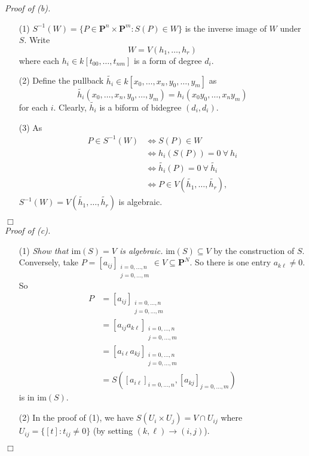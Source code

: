 \documentclass{article}
\begin{document}
\emph{Proof of (b).}
\begin{enumerate}
\item[(1)]
  $S^{-1}(W) = \{ P \in \mathbf{P}^{n} \times \mathbf{P}^{m} : S(P) \in W \}$
  is the inverse image of $W$ under $S$.
  Write
  \[
    W = V(h_1, \ldots, h_r)
  \]
  where each $h_i \in k[t_{00}, \ldots, t_{nm}]$ is a form of degree $d_i$.

\item[(2)]
  Define the pullback $\widetilde{h_i} \in k[x_0, \ldots, x_n, y_0, \ldots, y_m]$ as
  \[
    \widetilde{h_i}(x_0, \ldots, x_n, y_0, \ldots, y_m)
    = h_i(x_0 y_0, \ldots, x_n y_m)
  \]
  for each $i$.
  Clearly, $\widetilde{h_i}$ is a biform of bidegree $(d_i,d_i)$.

\item[(3)]
  As
  \begin{align*}
  P \in S^{-1}(W)
  &\Longleftrightarrow
    S(P) \in W \\
  &\Longleftrightarrow
    h_i(S(P)) = 0 \: \forall \: h_i \\
  &\Longleftrightarrow
    \widetilde{h_i}(P) = 0 \: \forall \: \widetilde{h_i} \\
  &\Longleftrightarrow
    P \in V(\widetilde{h_1}, \ldots, \widetilde{h_r}),
  \end{align*}
  $S^{-1}(W) = V(\widetilde{h_1}, \ldots, \widetilde{h_r})$ is algebraic.
\end{enumerate}
$\Box$ \\



\emph{Proof of (c).}
\begin{enumerate}
\item[(1)]
  \emph{Show that $\mathrm{im}(S) = V$ is algebraic.}
  $\mathrm{im}(S) \subseteq V$ by the construction of $S$.
  Conversely, take
  $P = [a_{ij}]_{\substack{i = 0,\ldots,n \\ j = 0,\ldots,m}} \in V \subseteq \mathbf{P}^{N}$.
  So there is one entry $a_{k\ell} \neq 0$.
  So
  \begin{align*}
    P
    &= [a_{ij}]_{\substack{i = 0,\ldots,n \\ j = 0,\ldots,m}} \\
    &= [a_{ij}a_{k\ell}]_{\substack{i = 0,\ldots,n \\ j = 0,\ldots,m}} \\
    &= [a_{i\ell}a_{kj}]_{\substack{i = 0,\ldots,n \\ j = 0,\ldots,m}} \\
    &= S([a_{i\ell}]_{i = 0,\ldots,n}, [a_{kj}]_{j = 0,\ldots,m})
  \end{align*}
  is in $\mathrm{im}(S)$.

\item[(2)]
  In the proof of (1),
  we have $S(U_i \times U_j) = V \cap U_{ij}$ where $U_{ij} = \{ [t] : t_{ij} \neq 0 \}$
  (by setting $(k,\ell) \to (i,j)$).
\end{enumerate}
$\Box$ \\
\end{document}
